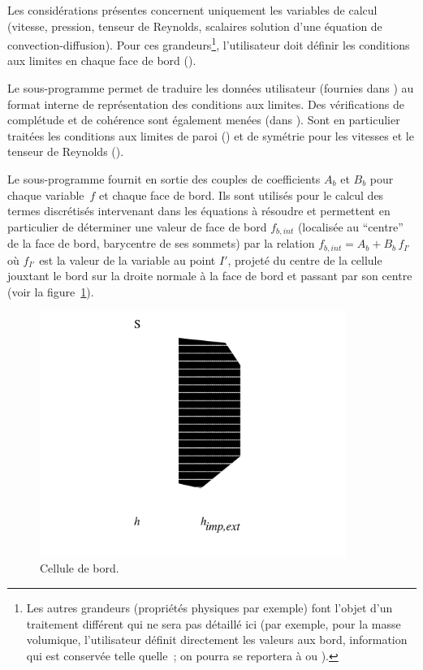Les consid\'erations pr\'esentes concernent uniquement les variables de calcul 
(vitesse, pression, tenseur de Reynolds, scalaires solution d'une \'equation 
de convection-diffusion). Pour ces grandeurs\footnote{
Les autres grandeurs 
(propri\'et\'es physiques par
exemple) font l'objet d'un traitement diff\'erent qui ne sera pas d\'etaill\'e
ici (par exemple, pour la masse volumique, l'utilisateur d\'efinit directement 
les valeurs aux bord, information qui est conserv\'ee telle quelle~; on pourra 
se reportera \`a  ou ).
}, 
l'utilisateur doit d\'efinir
les conditions aux limites en chaque face de bord (). 
  

Le sous-programme  permet de traduire les donn\'ees utilisateur
(fournies dans ) au format interne de repr\'esentation des conditions
aux limites. Des v\'erifications de compl\'etude et de coh\'erence sont
\'egalement men\'ees (dans ). Sont en particulier trait\'ees les conditions aux limites
de paroi () 
et de sym\'etrie pour les vitesses et le tenseur de Reynolds (). 

Le sous-programme  fournit en sortie des couples de coefficients 
$A_b$ et $B_b$ 
pour chaque variable~$f$ et chaque face  de bord. Ils sont utilis\'es pour le calcul des
termes discr\'etis\'es intervenant dans les \'equations \`a r\'esoudre et
permettent en particulier de d\'eterminer une valeur de face
de bord $f_{b,int}$ (localis\'ee au ``centre'' de la face de bord, 
barycentre de ses sommets) par la
relation $f_{b,int} = A_b+B_b\,f_{I'}$ o\`u $f_{I'}$ est la valeur de 
la variable au point
$I'$, projet\'e du centre de la cellule jouxtant le bord sur la droite 
normale \`a 
la face de bord et passant par son centre 
(voir la figure~\ref{Base_Condli_fig_flux_condli}). 

\begin{figure}[h]
\centerline{\includegraphics[height=8cm]{../Base/Condli/Images/fluxbord.pdf}}
\caption{\label{Base_Condli_fig_flux_condli}Cellule de bord.}
\end{figure}

